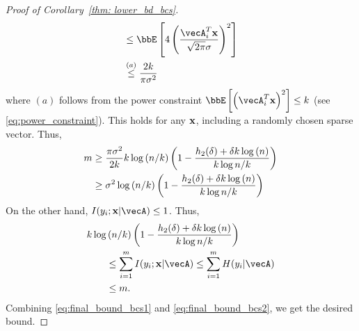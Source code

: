 \begin{proof}[Proof of Corollary~\ref{thm: lower_bd_bcs}]
\begin{align*}
&\leq \bbE\insq{4\inp{\frac{\vecA_i^T\bx}{\sqrt{2\pi}\sigma}}^2}\\
&\stackrel{(a)}{\leq}\frac{2k}{\pi\sigma^2} 
\end{align*}where $(a)$ follows from the power constraint $\bbE\insq{\inp{\vecA_i^T\bx}^2}\leq k$ (see \eqref{eq:power_constraint}). This holds for any $\mathbf{x}$, including a randomly chosen sparse vector.
Thus,
\begin{align}
m &\geq  \frac{\pi\sigma^2}{2k}k\log\left(n/k\right)\left(1-\frac{h_2(\delta)+ \delta k\log\left(n\right)}{k\log{n/k}}\right)\nonumber\\
& \geq \sigma^2\log\left(n/k\right)\left(1-\frac{h_2(\delta)+ \delta k\log\left(n\right)}{k\log{n/k}}\right)\label{eq:final_bound_bcs1}
\end{align}
On the other hand, $I(y_i;\bx|\vecA)\leq 1$. Thus,
\begin{align}
k\log&\inp{n/k}\inp{1-\frac{h_2(\delta)+ \delta k\log\inp{n}}{k\log{n/k}}}\nonumber\\
&\leq \sum_{i = 1}^{m}I(y_i;\bx|\vecA)\leq \sum_{i = 1}^{m}H(y_i|\vecA)\nonumber\\
&\leq m.\label{eq:final_bound_bcs2}
\end{align}
Combining \eqref{eq:final_bound_bcs1} and \eqref{eq:final_bound_bcs2}, we get the desired bound.
\end{proof}

